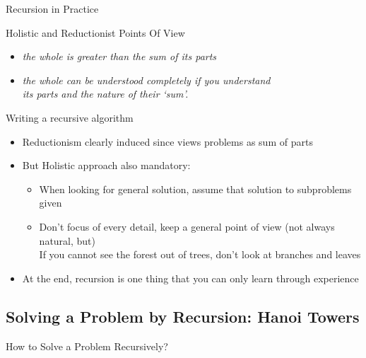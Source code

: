 \begin{Coupe}
\begin{frame}{Recursion in Practice}
  \begin{block}{Holistic and Reductionist Points Of View}
    \begin{itemize}
    \item {} \textit{the whole is greater than the sum of its
        parts}
    \item {} \textit{the whole can be understood
        completely if you understand \\
        its parts and the nature of their `sum'.}
    \end{itemize}    
  \end{block}

  \begin{block}{Writing a recursive algorithm}
    \begin{itemize}
    \item Reductionism clearly induced since views problems as sum of parts
    \item But Holistic approach also mandatory:
      \begin{itemize}
      \item When looking for general solution, assume that solution to
        subproblems given
      \item Don't focus of every detail, keep a general point of view
        {\footnotesize(not always natural, but)} \\
        If you cannot see the forest out of trees, don't look at branches and
        leaves
      \end{itemize}
    \item At the end, recursion is one thing that you can only learn through
      experience 
    \end{itemize}
  \end{block}

\end{frame}
\subsection{Solving a Problem by Recursion: Hanoi Towers}
\sectionpage
\begin{frame}{How to Solve a Problem Recursively?}


\end{frame}
\end{Coupe}
